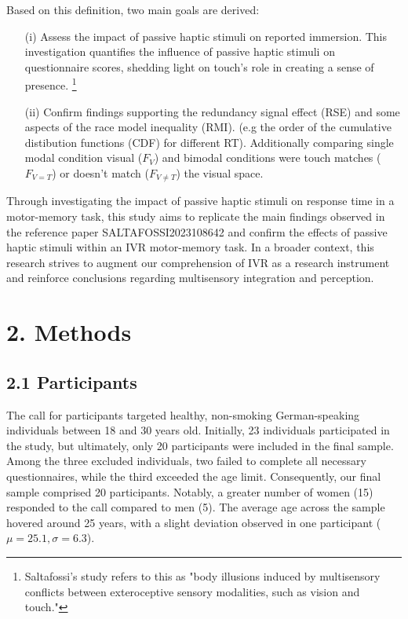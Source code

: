 \documentclass[12pt,oneside,openright]{report}
\begin{document}
Based on this definition, two main goals are derived:
\begin{itemize}
  \item[(i)] Assess the impact of passive haptic stimuli on reported immersion. This investigation quantifies the influence of passive haptic stimuli on questionnaire scores, shedding light on touch's role in creating a sense of presence. 
  \footnote{Saltafossi's study refers to this as "body illusions induced by multisensory conflicts between exteroceptive sensory modalities, such as vision and touch."}
    
  \item[(ii)] Confirm findings supporting the redundancy signal effect (RSE) and some aspects of the race model inequality (RMI). (e.g the order of the cumulative distibution functions (CDF) for different RT). Additionally comparing single modal condition visual ($F_V$) and bimodal conditions were touch matches ($F_{V=T}$) or doesn’t match ($F_{V \neq T}$) the visual space. 
\end{itemize}

Through investigating the impact of passive haptic stimuli on response time in a motor-memory task, this study aims to replicate the main findings observed in the reference paper {SALTAFOSSI2023108642} and confirm the effects of passive haptic stimuli within an IVR motor-memory task. In a broader context, this research strives to augment our comprehension of IVR as a research instrument and reinforce conclusions regarding multisensory integration and perception.

\section*{2. Methods}
\subsection*{2.1 Participants}
The call for participants targeted healthy, non-smoking German-speaking individuals between 18 and 30 years old. Initially, 23 individuals participated in the study, but ultimately, only 20 participants were included in the final sample. Among the three excluded individuals, two failed to complete all necessary questionnaires, while the third exceeded the age limit. Consequently, our final sample comprised 20 participants. Notably, a greater number of women (15) responded to the call compared to men (5). The average age across the sample hovered around 25 years, with a slight deviation observed in one participant ($\mu=25.1, \sigma=6.3$).
\end{document}
